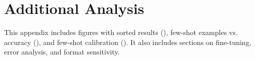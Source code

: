 
\section{Additional Analysis}\label{app:additional}



This appendix includes figures with sorted results (), few-shot examples vs. accuracy (), and few-shot calibration (). It also includes sections on fine-tuning, error analysis, and format sensitivity.

